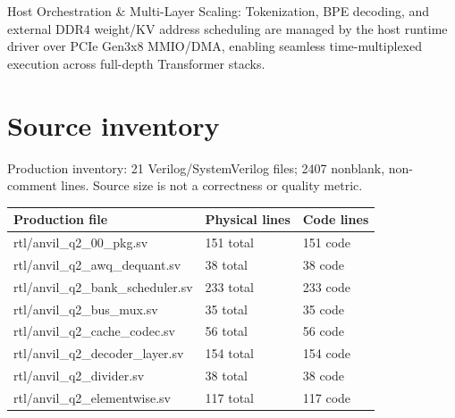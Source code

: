 \documentclass[11pt,a4paper]{article}
\begin{document}
Host Orchestration \& Multi-Layer Scaling: Tokenization,\allowbreak{} BPE decoding,\allowbreak{} and external DDR4 weight/\allowbreak{}KV address scheduling are managed by the host runtime driver over PCIe Gen3x8 MMIO/\allowbreak{}DMA,\allowbreak{} enabling seamless time-multiplexed execution across full-depth Transformer stacks.


\appendix{}\section{Source inventory}

Production inventory: 21 Verilog/\allowbreak{}SystemVerilog files; 2407 nonblank,\allowbreak{} non-comment lines. Source size is not a correctness or quality metric.

{\small\renewcommand{\arraystretch}{1.18}\begin{longtable}{@{}L{0.55\textwidth}|L{0.18\textwidth}|L{0.18\textwidth}@{}}\toprule

\textbf{Production file} & \textbf{Physical lines} & \textbf{Code lines}\\\midrule\endhead

rtl/\allowbreak{}anvil\_\allowbreak{}q2\_\allowbreak{}00\_\allowbreak{}pkg.sv & 151 total & 151 code\\[2pt]\hline

rtl/\allowbreak{}anvil\_\allowbreak{}q2\_\allowbreak{}awq\_\allowbreak{}dequant.sv & 38 total & 38 code\\[2pt]\hline

rtl/\allowbreak{}anvil\_\allowbreak{}q2\_\allowbreak{}bank\_\allowbreak{}scheduler.sv & 233 total & 233 code\\[2pt]\hline

rtl/\allowbreak{}anvil\_\allowbreak{}q2\_\allowbreak{}bus\_\allowbreak{}mux.sv & 35 total & 35 code\\[2pt]\hline

rtl/\allowbreak{}anvil\_\allowbreak{}q2\_\allowbreak{}cache\_\allowbreak{}codec.sv & 56 total & 56 code\\[2pt]\hline

rtl/\allowbreak{}anvil\_\allowbreak{}q2\_\allowbreak{}decoder\_\allowbreak{}layer.sv & 154 total & 154 code\\[2pt]\hline

rtl/\allowbreak{}anvil\_\allowbreak{}q2\_\allowbreak{}divider.sv & 38 total & 38 code\\[2pt]\hline

rtl/\allowbreak{}anvil\_\allowbreak{}q2\_\allowbreak{}elementwise.sv & 117 total & 117 code\\[2pt]\hline


\end{longtable}}
\end{document}
